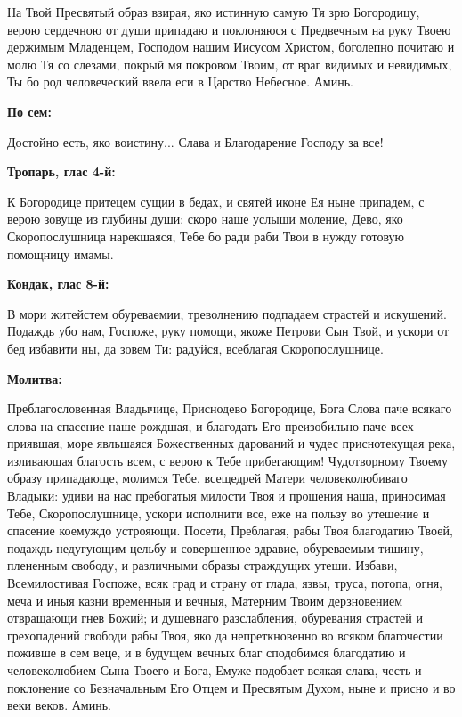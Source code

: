 На Твой Пресвятый образ взирая, яко истинную самую Тя зрю Богородицу, верою сердечною от души припадаю и поклоняюся с Предвечным на руку Твоею держимым Младенцем, Господом нашим Иисусом Христом, боголепно почитаю и молю Тя со слезами, покрый мя покровом Твоим, от враг видимых и невидимых, Ты бо род человеческий ввела еси в Царство Небесное. Аминь.


\medskip


\bfseries По сем:\normalfont{}\nopagebreak


Достойно есть, яко воистину... Слава и Благодарение Господу за все!


\bigskip\bigskip\mychapterending

 


\bfseries Тропарь, глас 4-й:\normalfont{}\nopagebreak


К Богородице притецем сущии в бедах, и святей иконе Ея ныне припадем, с верою зовуще из глубины души: скоро наше услыши моление, Дево, яко Скоропослушница нарекшаяся, Тебе бо ради раби Твои в нужду готовую помощницу имамы.


\medskip


\bfseries Кондак, глас 8-й\normalfont{}:


В мори житейстем обуреваемии, треволнению подпадаем страстей и искушений. Подаждь убо нам, Госпоже, руку помощи, якоже Петрови Сын Твой, и ускори от бед избавити ны, да зовем Ти: радуйся, всеблагая Скоропослушнице.


\medskip


\bfseries Молитва\normalfont{}:


Преблагословенная Владычице, Приснодево Богородице, Бога Слова паче всякаго слова на спасение наше рождшая, и благодать Его преизобильно паче всех приявшая, море явльшаяся Божественных дарований и чудес приснотекущая река, изливающая благость всем, с верою к Тебе прибегающим! Чудотворному Твоему образу припадающе, молимся Тебе, всещедрей Матери человеколюбиваго Владыки: удиви на нас пребогатыя милости Твоя и прошения наша, приносимая Тебе, Скоропослушнице, ускори исполнити все, еже на пользу во утешение и спасение коемуждо устрояющи. Посети, Преблагая, рабы Твоя благодатию Твоей, подаждь недугующим цельбу и совершенное здравие, обуреваемым тишину, плененным свободу, и различными образы страждущих утеши. Избави, Всемилостивая Госпоже, всяк град и страну от глада, язвы, труса, потопа, огня, меча и иныя казни временныя и вечныя, Матерним Твоим дерзновением отвращающи гнев Божий; и душевнаго разслабления, обуревания страстей и грехопадений свободи рабы Твоя, яко да непреткновенно во всяком благочестии поживше в сем веце, и в будущем вечных благ сподобимся благодатию и человеколюбием Сына Твоего и Бога, Емуже подобает всякая слава, честь и поклонение со Безначальным Его Отцем и Пресвятым Духом, ныне и присно и во веки веков. Аминь.


